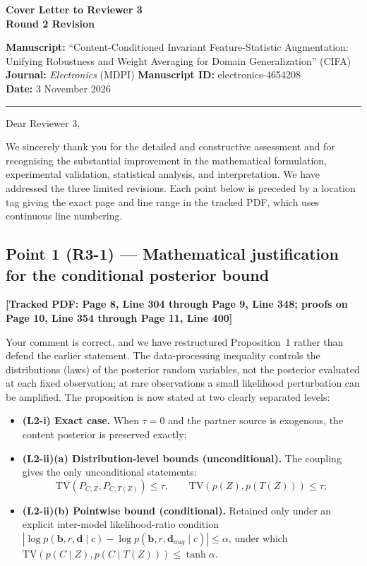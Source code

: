 \documentclass[11pt]{article}
\newcommand{\loc}[1]{\textbf{[\textcolor{revblue}{Tracked PDF: #1}]}}
\begin{document}
\begin{center}
{\Large\textbf{Cover Letter to Reviewer 3}}\\[0.5em]
\textbf{Round 2 Revision}
\end{center}

\textbf{Manuscript:} ``Content-Conditioned Invariant Feature-Statistic
Augmentation: Unifying Robustness and Weight Averaging for Domain
Generalization'' (CIFA)\\
\textbf{Journal:} \textit{Electronics} (MDPI)\qquad
\textbf{Manuscript ID:} electronics-4654208\\
\textbf{Date:} 3 November 2026

\hrule
\vspace{0.4em}

Dear Reviewer 3,

We sincerely thank you for the detailed and constructive assessment and for
recognising the substantial improvement in the mathematical formulation,
experimental validation, statistical analysis, and interpretation. We have
addressed the three limited revisions. Each point below is preceded by a
location tag giving the exact page and line range in the tracked PDF, which
uses continuous line numbering.

\subsection*{Point 1 (R3-1) --- Mathematical justification for the conditional posterior bound}
\loc{Page 8, Line 304 through Page 9, Line 348; proofs on Page 10, Line 354
through Page 11, Line 400}

Your comment is correct, and we have restructured Proposition~1 rather than
defend the earlier statement. The data-processing inequality controls the
distributions (laws) of the posterior random variables, not the posterior
evaluated at each fixed observation; at rare observations a small likelihood
perturbation can be amplified. The proposition is now stated at two clearly
separated levels:

\begin{itemize}
\item \textbf{(L2-i) Exact case.} When $\tau=0$ and the partner source is
exogenous, the content posterior is preserved exactly;
\item \textbf{(L2-ii)(a) Distribution-level bounds (unconditional).} The
coupling gives the only unconditional statements:
\[
\mathrm{TV}(P_{C,Z},P_{C,T(Z)})\le\tau,\qquad
\mathrm{TV}(p(Z),p(T(Z)))\le\tau;
\]
\item \textbf{(L2-ii)(b) Pointwise bound (conditional).} Retained only under
an explicit inter-model likelihood-ratio condition
$|\log p(\mathbf{b},r,\mathbf{d}\mid c)-\log
p(\mathbf{b},r,\mathbf{d}_{aug}\mid c)|\le\alpha$, under which
$\mathrm{TV}(p(C\mid Z),p(C\mid T(Z)))\le\tanh\alpha$.
\end{itemize}
\end{document}
